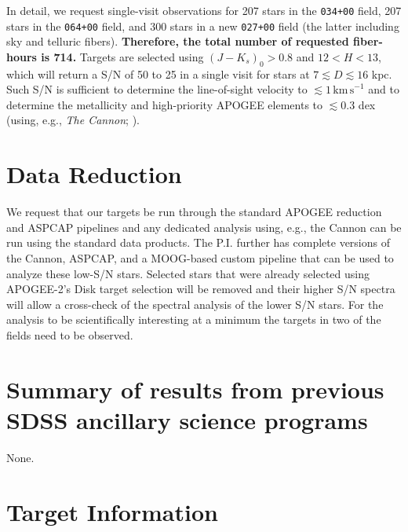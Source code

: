 \documentclass[12pt,preprint]{aastex}
\newcommand{\eg}{e.g.}
\begin{document}
In detail, we request single-visit observations for 207 stars in the
\texttt{034+00} field, 207 stars in the \texttt{064+00} field, and 300
stars in a new \texttt{027+00} field (the latter including sky and
telluric fibers). {\bf Therefore, the total number of requested
  fiber-hours is 714.} Targets are selected using $(J-K_s)_0 > 0.8$
and $12 < H < 13$, which will return a S/N of 50 to 25 in a single
visit for stars at $7 \lesssim D \lesssim 16$ kpc. Such S/N is
sufficient to determine the line-of-sight velocity to
$\lesssim1\,\mathrm{km\,s}^{-1}$ and to determine the metallicity and
high-priority APOGEE elements to $\lesssim0.3$ dex (using, \eg,
\emph{The Cannon}; \citealt{Ness15a}).

\section{Data Reduction}

We request that our targets be run through the standard APOGEE
reduction and ASPCAP pipelines and any dedicated analysis using, \eg,
the Cannon can be run using the standard data products. The
P.I. further has complete versions of the Cannon, ASPCAP, and a
MOOG-based custom pipeline that can be used to analyze these low-S/N
stars. Selected stars that were already selected using APOGEE-2's Disk
target selection will be removed and their higher S/N spectra will
allow a cross-check of the spectral analysis of the lower S/N
stars. For the analysis to be scientifically interesting at a minimum
the targets in two of the fields need to be observed.


\section{Summary of results from previous SDSS ancillary science programs}

None.

\newpage

\section{Target Information}
\end{document}
